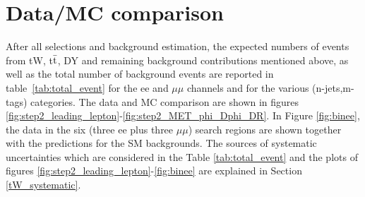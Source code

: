 
\clearpage
\section{Data/MC comparison}
\label{tW_data_mc}
After all selections and background estimation, the expected numbers of events from tW, t$\bar{\rm t}$, DY and remaining background contributions mentioned above, as well as the total number of background events are reported in table~\ref{tab:total_event} for the ee and $\mu\mu$ channels and for the various (n-jets,m-tags) categories. The data and MC comparison are shown in figures \ref{fig:step2_leading_lepton}-\ref{fig:step2_MET_phi_Dphi_DR}. In Figure \ref{fig:binee}, the data in the six (three ee plus three $\mu\mu$) search regions are shown together with the predictions for the SM backgrounds. The sources of systematic uncertainties which are considered in the Table \ref{tab:total_event} and the plots of figures \ref{fig:step2_leading_lepton}-\ref{fig:binee} are explained in Section \ref{tW_systematic}.

